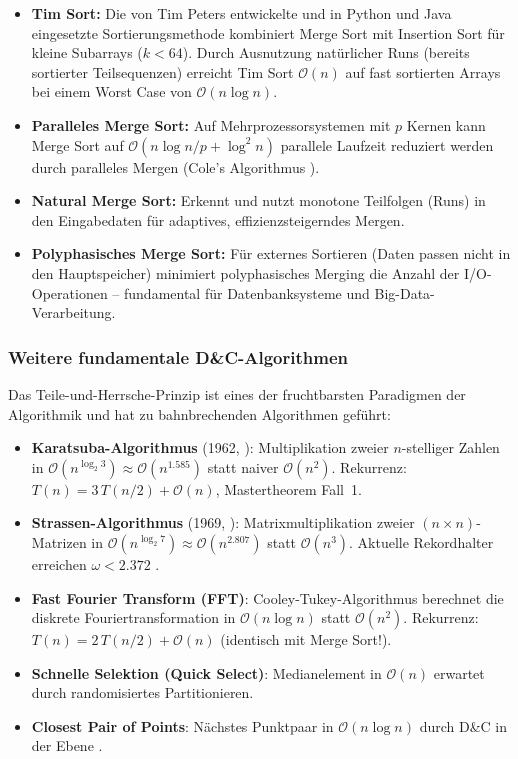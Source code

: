 ﻿\documentclass[a4paper,12pt]{article}
\theoremstyle{definition}
\begin{document}
\begin{itemize}
    \item \textbf{Tim Sort:} Die von Tim Peters entwickelte und in Python und Java
          eingesetzte Sortierungsmethode kombiniert Merge Sort mit Insertion Sort
          für kleine Subarrays ($k < 64$). Durch Ausnutzung natürlicher Runs
          (bereits sortierter Teilsequenzen) erreicht Tim Sort $\mathcal{O}(n)$
          auf fast sortierten Arrays bei einem Worst Case von $\mathcal{O}(n \log n)$.
    \item \textbf{Paralleles Merge Sort:} Auf Mehrprozessorsystemen mit $p$ Kernen
          kann Merge Sort auf $\mathcal{O}(n \log n / p + \log^2 n)$ parallele
          Laufzeit reduziert werden durch paralleles Mergen (Cole's Algorithmus
          \cite{cole1988}).
    \item \textbf{Natural Merge Sort:} Erkennt und nutzt monotone Teilfolgen
          (Runs) in den Eingabedaten für adaptives, effizienzsteigerndes Mergen.
    \item \textbf{Polyphasisches Merge Sort:} Für externes Sortieren (Daten
          passen nicht in den Hauptspeicher) minimiert polyphasisches Merging
          die Anzahl der I/O-Operationen -- fundamental für Datenbanksysteme
          und Big-Data-Verarbeitung.
\end{itemize}

\subsubsection{Weitere fundamentale D\&C-Algorithmen}

Das Teile-und-Herrsche-Prinzip ist eines der fruchtbarsten Paradigmen der
Algorithmik und hat zu bahnbrechenden Algorithmen geführt:

\begin{itemize}
    \item \textbf{Karatsuba-Algorithmus} (1962, \cite{karatsuba1962}): Multiplikation
          zweier $n$-stelliger Zahlen in $\mathcal{O}(n^{\log_2 3}) \approx \mathcal{O}(n^{1.585})$
          statt naiver $\mathcal{O}(n^2)$.
          Rekurrenz: $T(n) = 3\,T(n/2) + \mathcal{O}(n)$, Mastertheorem Fall~1.
    \item \textbf{Strassen-Algorithmus} (1969, \cite{strassen1969}): Matrixmultiplikation
          zweier $(n \times n)$-Matrizen in $\mathcal{O}(n^{\log_2 7}) \approx \mathcal{O}(n^{2.807})$
          statt $\mathcal{O}(n^3)$. Aktuelle Rekordhalter erreichen $\omega < 2.372$
          \cite{williams2023}.
    \item \textbf{Fast Fourier Transform (FFT)}: Cooley-Tukey-Algorithmus \cite{cooley1965}
          berechnet die diskrete Fouriertransformation in $\mathcal{O}(n \log n)$
          statt $\mathcal{O}(n^2)$. Rekurrenz: $T(n) = 2\,T(n/2) + \mathcal{O}(n)$
          (identisch mit Merge Sort!).
    \item \textbf{Schnelle Selektion (Quick Select)}: Medianelement in
          $\mathcal{O}(n)$ erwartet durch randomisiertes Partitionieren.
    \item \textbf{Closest Pair of Points}: Nächstes Punktpaar in $\mathcal{O}(n \log n)$
          durch D\&C in der Ebene \cite{shamos1975}.
\end{itemize}
\end{document}
